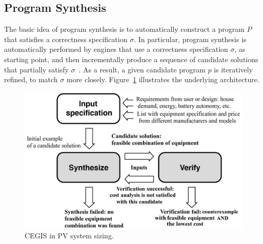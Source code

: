 \documentclass[runningheads]{llncs}
\begin{document}
\subsection{Program Synthesis}
\label{sec:ProgramSynthesis}


The basic idea of program synthesis is to automatically construct a program $P$ that satisfies a correctness specification $\sigma$. In particular, program synthesis is automatically performed by engines that use a correctness specification $\sigma$, as starting point, and then incrementally produce a sequence of candidate solutions that partially satisfy $\sigma$~\cite{Abateetal2017}. As a result, a given candidate program $p$ is iteratively refined, to match $\sigma$ more closely. 
Figure~\ref{Counter-Example-Guided-Inductive-Synthesis} illustrates the underlying architecture. 
%
\begin{figure}
\begin{center}
	\includegraphics[width=0.5\columnwidth]{fig2_rev2.jpg}
\end{center}	
	\caption{CEGIS in PV system sizing.}
	\label{Counter-Example-Guided-Inductive-Synthesis}
\end{figure}
\end{document}
